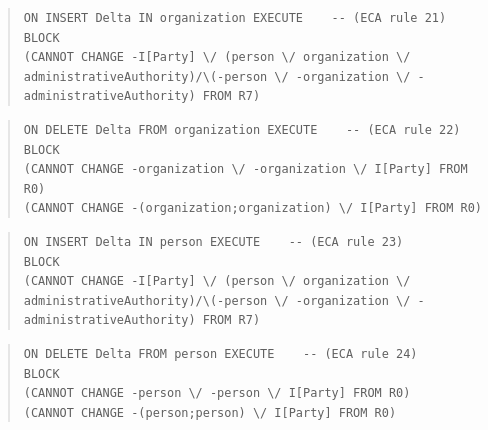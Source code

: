 \documentclass[10pt,a4paper]{report}              %
\theoremstyle{plain}\theorembodyfont{\rmfamily}\newtheorem{definition}{Definition}[section]
\theoremstyle{plain}\theorembodyfont{\rmfamily}\newtheorem{designrule}[definition]{Requirement}
\begin{document}
\begin{quote}
\begin{verbatim}
ON INSERT Delta IN organization EXECUTE    -- (ECA rule 21)
BLOCK
(CANNOT CHANGE -I[Party] \/ (person \/ organization \/ administrativeAuthority)/\(-person \/ -organization \/ -administrativeAuthority) FROM R7)
\end{verbatim}
\end{quote}
\begin{quote}
\begin{verbatim}
ON DELETE Delta FROM organization EXECUTE    -- (ECA rule 22)
BLOCK
(CANNOT CHANGE -organization \/ -organization \/ I[Party] FROM R0)
(CANNOT CHANGE -(organization;organization) \/ I[Party] FROM R0)
\end{verbatim}
\end{quote}
\begin{quote}
\begin{verbatim}
ON INSERT Delta IN person EXECUTE    -- (ECA rule 23)
BLOCK
(CANNOT CHANGE -I[Party] \/ (person \/ organization \/ administrativeAuthority)/\(-person \/ -organization \/ -administrativeAuthority) FROM R7)
\end{verbatim}
\end{quote}
\begin{quote}
\begin{verbatim}
ON DELETE Delta FROM person EXECUTE    -- (ECA rule 24)
BLOCK
(CANNOT CHANGE -person \/ -person \/ I[Party] FROM R0)
(CANNOT CHANGE -(person;person) \/ I[Party] FROM R0)
\end{verbatim}
\end{quote}
\end{document}
